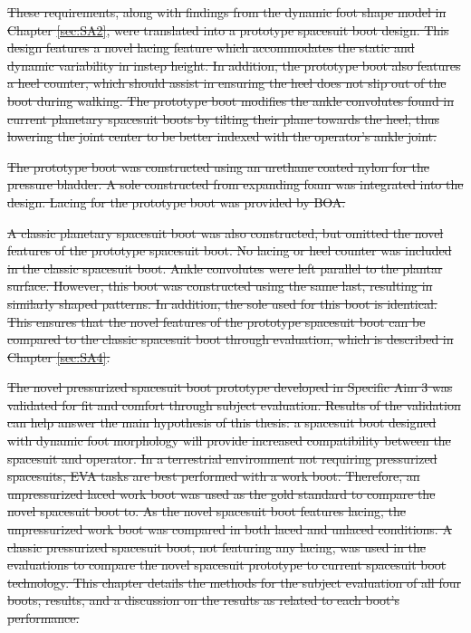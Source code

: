 \documentclass[defaultstyle,11pt]{thesis}
\providecommand{\DIFdeltex}[1]{{\protect\color{red}\sout{#1}}}                      %
\providecommand{\DIFdel}[1]{\texorpdfstring{\DIFdeltex{#1}}{}} %
\begin{document}
\DIFdel{These requirements, along with findings from the dynamic foot shape model in Chapter \ref{sec:SA2}, were translated into a prototype spacesuit boot design.
This design features a novel lacing feature which accommodates the static and dynamic variability in instep height.
In addition, the prototype boot also features a heel counter, which should assist in ensuring the heel does not slip out of the boot during walking.
The prototype boot modifies the ankle convolutes found in current planetary spacesuit boots by tilting their plane towards the heel, thus lowering the joint center to be better indexed with the operator's ankle joint.
}%

\DIFdel{The prototype boot was constructed using an urethane coated nylon for the pressure bladder.
A sole constructed from expanding foam was integrated into the design.
Lacing for the prototype boot was provided by BOA.
}%

\DIFdel{A classic planetary spacesuit boot was also constructed, but omitted the novel features of the prototype spacesuit boot.
No lacing or heel counter was included in the classic spacesuit boot.
Ankle convolutes were left parallel to the plantar surface.
However, this boot was constructed using the same last, resulting in similarly shaped patterns.
In addition, the sole used for this boot is identical.
This ensures that the novel features of the prototype spacesuit boot can be compared to the classic spacesuit boot through evaluation, which is described in Chapter \ref{sec:SA4}.
}%


\DIFdel{The novel pressurized spacesuit boot prototype developed in Specific Aim 3 was validated for fit and comfort through subject evaluation.
Results of the validation can help answer the main hypothesis of this thesis: a spacesuit boot designed with dynamic foot morphology will provide increased compatibility between the spacesuit and operator.
In a terrestrial environment not requiring pressurized spacesuits, EVA tasks are best performed with a work boot.
Therefore, an unpressurized laced work boot was used as the gold standard to compare the novel spacesuit boot to.
As the novel spacesuit boot features lacing, the unpressurized work boot was compared in both laced and unlaced conditions.
A classic pressurized spacesuit boot, not featuring any lacing, was used in the evaluations to compare the novel spacesuit prototype to current spacesuit boot technology.
This chapter details the methods for the subject evaluation of all four boots, results, and a discussion on the results as related to each boot's performance.
}%
\end{document}
